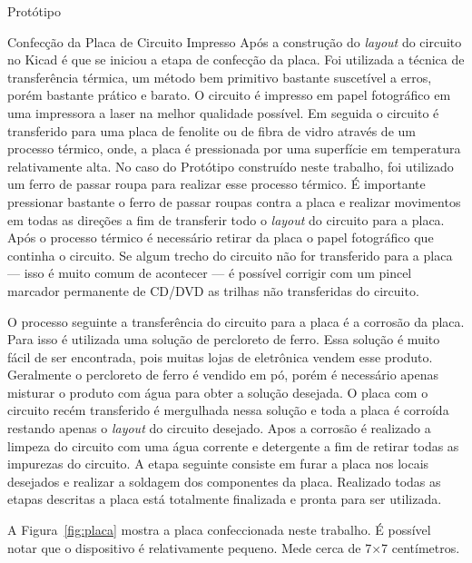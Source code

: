 \begin{chapter}{Protótipo}
\begin{section}{Confecção da Placa de Circuito Impresso}
Após a construção do \textit{layout} do circuito no Kicad é que se iniciou a
etapa de confecção da placa. Foi utilizada a técnica de transferência térmica,
um método bem primitivo bastante suscetível a erros, porém bastante prático e
barato. O circuito é impresso em papel fotográfico em uma impressora a laser na
melhor qualidade possível. Em seguida o circuito é transferido para uma placa de
fenolite ou de fibra de vidro através de um processo térmico, onde, a placa é
pressionada por uma superfície em temperatura relativamente alta. No caso do
Protótipo construído neste trabalho, foi utilizado um ferro de passar roupa para
realizar esse processo térmico. É importante pressionar bastante o ferro de
passar roupas contra a placa e realizar movimentos em todas as direções a fim 
de transferir todo o \textit{layout} do circuito para a placa. Após o processo
térmico é necessário retirar da placa o papel fotográfico que continha o 
circuito. Se algum trecho do circuito não for transferido para a placa --- isso
é muito comum de acontecer --- é possível corrigir com um pincel
marcador permanente de CD/DVD as trilhas não transferidas do circuito.  

O processo seguinte a transferência do circuito para a placa é a corrosão da
placa. Para isso é utilizada uma solução de percloreto de ferro. Essa solução é
muito fácil de ser encontrada, pois muitas lojas de eletrônica vendem esse
produto. Geralmente o percloreto de ferro é vendido em pó, porém é necessário
apenas misturar o produto com água para obter a solução desejada. O placa com o
circuito recém transferido é mergulhada nessa solução e toda a placa é corroída
restando apenas o \textit{layout} do circuito desejado. Apos a corrosão é
realizado a limpeza do circuito com uma água corrente e detergente a fim de
retirar todas as impurezas do circuito. A etapa seguinte consiste em furar a
placa nos locais desejados e realizar a soldagem dos componentes da placa.
Realizado todas as etapas descritas a placa está totalmente finalizada e pronta
para ser utilizada. 


A Figura~\ref{fig:placa} mostra a placa confeccionada neste trabalho. É possível
notar que o dispositivo é relativamente pequeno. Mede cerca de 7$\times$7
centímetros.       


\end{section}
\end{chapter}
